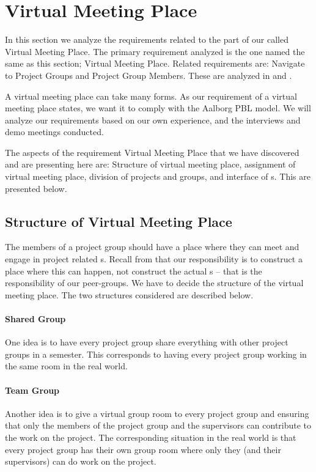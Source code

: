 \section{Virtual Meeting Place}
\label{sec:virtualMeetingPlace}
\label{sec:projectgroup}
In this section we analyze the requirements related to the part of our \subsystem{} called Virtual Meeting Place.
The primary requirement analyzed is the one named the same as this section; Virtual Meeting Place.
Related requirements are: Navigate to Project Groups and Project Group Members.
These are analyzed in  and .

A virtual meeting place can take many forms.
As our requirement of a virtual meeting place states, we want it to comply with the Aalborg PBL model.
We will analyze our requirements based on our own experience, and the interviews and demo meetings conducted.

The aspects of the requirement Virtual Meeting Place that we have discovered and are presenting here are: Structure of virtual meeting place, assignment of virtual meeting place, division of projects and groups, and interface of \detdeandrelaver[]s.
This are presented below.


\subsection{Structure of Virtual Meeting Place}
The members of a project group should have a place where they can meet and engage in project related \detdeandrelaver[]s.
Recall from  that our responsibility is to construct a place where this can happen, not construct the actual \detdeandrelaver[]s -- that is the responsibility of our peer-groups.
We have to decide the structure of the virtual meeting place.
The two structures considered are described below.

\paragraph{Shared Group} One idea is to have every project group share everything with other project groups in a semester.
This corresponds to having every project group working in the same room in the real world.

\paragraph{Team Group} Another idea is to give a virtual group room to every project group and ensuring that only the members of the project group and the supervisors can contribute to the work on the project.
The corresponding situation in the real world is that every project group has their own group room where only they (and their supervisors) can do work on the project. \\

